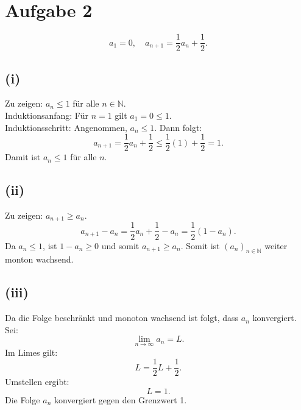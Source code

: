 \documentclass{article}
\begin{document}
\section*{Aufgabe 2}
\[a_1 = 0, \quad a_{n+1} = \frac{1}{2}a_n + \frac{1}{2}.\]

\subsection*{(i)}  
Zu zeigen: \(a_n \leq 1\) für alle \(n \in \mathbb{N}\).  \\
Induktionsanfang: Für \(n = 1\) gilt \(a_1 = 0 \leq 1\). \\
Induktionsschritt: Angenommen, \(a_n \leq 1\). Dann folgt:
    \[a_{n+1} = \frac{1}{2}a_n + \frac{1}{2} \leq \frac{1}{2}(1) + \frac{1}{2} =1.\]
Damit ist \(a_n \leq 1\) für alle \(n\).

\subsection*{(ii)}  
Zu zeigen: \(a_{n+1} \geq a_n\).  
\[a_{n+1} - a_n = \frac{1}{2}a_n + \frac{1}{2} - a_n = \frac{1}{2}(1 - a_n).\]
Da \(a_n \leq 1\), ist \(1 - a_n \geq 0\) und somit \(a_{n+1} \geq a_n\). Somit ist \((a_n)_{n\in \mathbb{N}}\) weiter monton wachsend.

\subsection*{(iii)}  
Da die Folge beschränkt und monoton wachsend ist folgt, dass \(a_n\) konvergiert. Sei:
\[\lim_{n \to \infty} a_n = L.\]
Im Limes gilt:
\[L = \frac{1}{2}L + \frac{1}{2}.\]
Umstellen ergibt:
\[L = 1.\]
Die Folge \(a_n\) konvergiert gegen den Grenzwert 1. 
\end{document}

